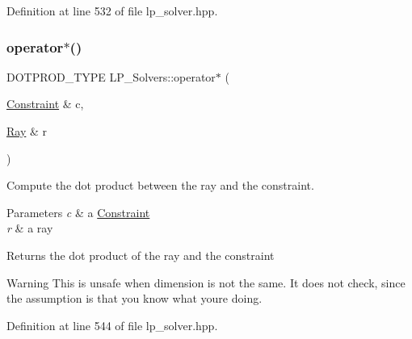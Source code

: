 Definition at line 532 of file lp\+\_\+solver.\+hpp.

\mbox{\label{group___c_l_s_solvers_gaf9f83e5d45bfc080fbffde26ebb93892}} 
\subsubsection{\texorpdfstring{operator$\ast$()}{operator*()}\hspace{0.1cm}{\footnotesize\ttfamily [6/6]}}
{\footnotesize\ttfamily D\+O\+T\+P\+R\+O\+D\+\_\+\+T\+Y\+PE L\+P\+\_\+\+Solvers\+::operator$\ast$ (\begin{DoxyParamCaption}\item[{\hyperlink{group___c_l_s_solvers_class_l_p___solvers_1_1_constraint}{Constraint} \&}]{c,  }\item[{\hyperlink{group___c_l_s_solvers_class_l_p___solvers_1_1_ray}{Ray} \&}]{r }\end{DoxyParamCaption})\hspace{0.3cm}{\ttfamily [inline]}}



Compute the dot product between the ray and the constraint. 


\begin{DoxyParams}{Parameters}
{\em c} & a \hyperlink{group___c_l_s_solvers_class_l_p___solvers_1_1_constraint}{Constraint} \\
\hline
{\em r} & a ray \\
\hline
\end{DoxyParams}
\begin{DoxyReturn}{Returns}
the dot product of the ray and the constraint 
\end{DoxyReturn}
\begin{DoxyWarning}{Warning}
This is unsafe when dimension is not the same. It does not check, since the assumption is that you know what you\textquotesingle{}re doing. 
\end{DoxyWarning}


Definition at line 544 of file lp\+\_\+solver.\+hpp.

\mbox{\label{group___c_l_s_solvers_gaf293c6d803dc697897463525aa1d1d44}} 
